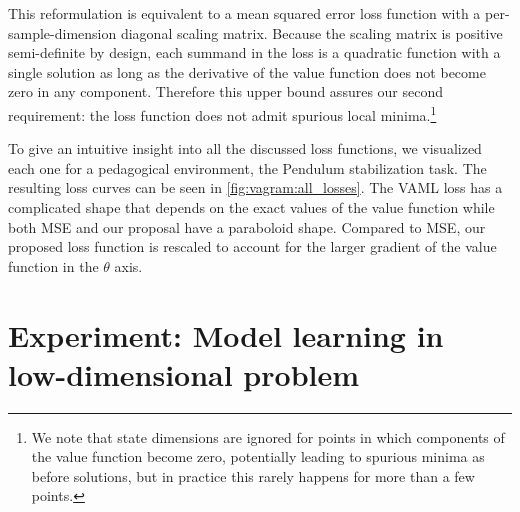 This reformulation is equivalent to a mean squared error loss function with a per-sample-dimension diagonal scaling matrix.
Because the scaling matrix is positive semi-definite by design, each summand in the loss is a quadratic function with a single solution as long as the derivative of the value function does not become zero in any component.
Therefore this upper bound assures our second requirement: the loss function does not admit spurious local minima.\footnote{We note that state dimensions are ignored for points in which components of the value function become zero, potentially leading to spurious minima as before solutions, but in practice this rarely happens for more than a few points.}

To give an intuitive insight into all the discussed loss functions, we visualized each one for a pedagogical environment, the Pendulum stabilization task.
The resulting loss curves can be seen in \autoref{fig:vagram:all_losses}.
The VAML loss has a complicated shape that depends on the exact values of the value function while both MSE and our proposal have a paraboloid shape.
Compared to MSE, our proposed loss function is rescaled to account for the larger gradient of the value function in the $\theta$ axis.

\section{Experiment: Model learning in low-dimensional problem}
\label{sec:vagram:experiments}

